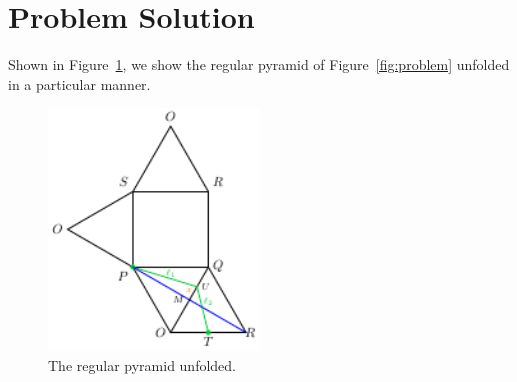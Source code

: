 \section{Problem Solution}
\label{sec:solution}

Shown in Figure~\ref{fig:unfolded}, we show the regular pyramid of
Figure~\ref{fig:problem} unfolded in a particular manner.

\begin{figure}[h]
  \centering
  \includegraphics[trim={0 0 0
  0cm},clip,width=0.5\textwidth]{./figures/pyramid-unfolded.pdf}
  \vspace{-8mm}
  \caption{The regular pyramid unfolded.}
  \label{fig:unfolded}
\end{figure}

